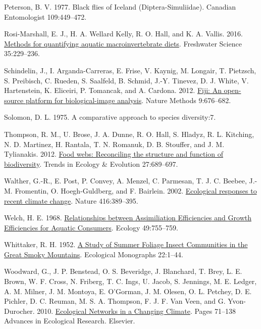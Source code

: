 \documentclass[
]{article}
\newlength{\cslhangindent}
\newlength{\cslentryspacingunit} %
\newenvironment{CSLReferences}[2] %
 {%
  \setlength{\parindent}{0pt}
  \ifodd #1
  \let\oldpar\par
  \def\par{\hangindent=\cslhangindent\oldpar}
  \fi
  \setlength{\parskip}{#2\cslentryspacingunit}
 }%
 {}
\begin{document}
\begin{CSLReferences}{1}{0}
\leavevmode{}%
Peterson, B. V. 1977. Black flies of {Iceland} ({Diptera-Simuliidae}).
Canadian Entomologist 109:449--472.

\leavevmode{}%
Rosi-Marshall, E. J., H. A. Wellard Kelly, R. O. Hall, and K. A. Vallis.
2016. \href{https://doi.org/10.1086/684648}{Methods for quantifying
aquatic macroinvertebrate diets}. Freshwater Science 35:229--236.

\leavevmode{}%
Schindelin, J., I. Arganda-Carreras, E. Frise, V. Kaynig, M. Longair, T.
Pietzsch, S. Preibisch, C. Rueden, S. Saalfeld, B. Schmid, J.-Y.
Tinevez, D. J. White, V. Hartenstein, K. Eliceiri, P. Tomancak, and A.
Cardona. 2012. \href{https://doi.org/10.1038/nmeth.2019}{Fiji: An
open-source platform for biological-image analysis}. Nature Methods
9:676--682.

\leavevmode{}%
Solomon, D. L. 1975. A comparative approach to species diversity:7.

\leavevmode{}%
Thompson, R. M., U. Brose, J. A. Dunne, R. O. Hall, S. Hladyz, R. L.
Kitching, N. D. Martinez, H. Rantala, T. N. Romanuk, D. B. Stouffer, and
J. M. Tylianakis. 2012.
\href{https://doi.org/10.1016/j.tree.2012.08.005}{Food webs: Reconciling
the structure and function of biodiversity}. Trends in Ecology \&
Evolution 27:689--697.

\leavevmode{}%
Walther, G.-R., E. Post, P. Convey, A. Menzel, C. Parmesan, T. J. C.
Beebee, J.-M. Fromentin, O. Hoegh-Guldberg, and F. Bairlein. 2002.
\href{https://doi.org/10.1038/416389a}{Ecological responses to recent
climate change}. Nature 416:389--395.

\leavevmode{}%
Welch, H. E. 1968. \href{https://doi.org/10.2307/1935541}{Relationships
between {Assimiliation Efficiencies} and {Growth Efficiencies} for
{Aquatic Consumers}}. Ecology 49:755--759.

\leavevmode{}%
Whittaker, R. H. 1952. \href{https://doi.org/10.2307/1948527}{A {Study}
of {Summer Foliage Insect Communities} in the {Great Smoky Mountains}}.
Ecological Monographs 22:1--44.

\leavevmode{}%
Woodward, G., J. P. Benstead, O. S. Beveridge, J. Blanchard, T. Brey, L.
E. Brown, W. F. Cross, N. Friberg, T. C. Ings, U. Jacob, S. Jennings, M.
E. Ledger, A. M. Milner, J. M. Montoya, E. O'Gorman, J. M. Olesen, O. L.
Petchey, D. E. Pichler, D. C. Reuman, M. S. A. Thompson, F. J. F. Van
Veen, and G. Yvon-Durocher. 2010.
\href{https://doi.org/10.1016/B978-0-12-381363-3.00002-2}{Ecological
{Networks} in a {Changing Climate}}. Pages 71--138 Advances in
{Ecological Research}. {Elsevier}.


\end{CSLReferences}
\end{document}
